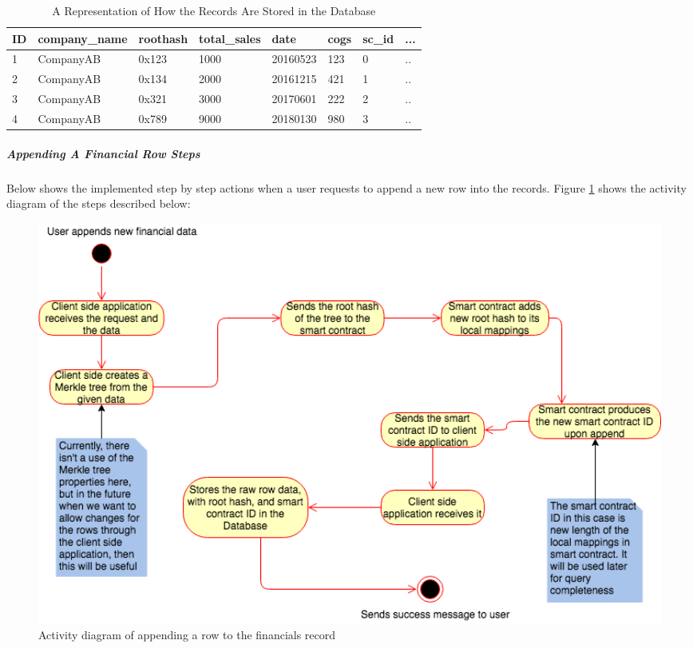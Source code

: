 \begin{table} 
	\centering
	\caption{A Representation of How the Records Are Stored in the Database}
    \begin{tabular}{| l | l | l | l | l | l | l | l |}
    \hline
    ID & company\_name & roothash & total\_sales & date & cogs & sc\_id & ... \\ \hline
    1 & CompanyAB & 0x123 & 1000 & 20160523 & 123 & 0 & .. \\ \hline
    2 & CompanyAB & 0x134 & 2000 & 20161215 & 421 & 1 & .. \\ \hline
    3 & CompanyAB & 0x321 & 3000 & 20170601 & 222 & 2 & .. \\ \hline
    4 & CompanyAB & 0x789 & 9000 & 20180130 & 980 & 3 & .. \\ \hline
    \end{tabular}
	\label{table:recordsOffChain}
\end{table}

\subparagraph{Appending A Financial Row Steps}
Below shows the implemented step by step actions when a user requests to append a new row into the records. Figure \ref{fig:appendRowFinancials} shows the activity diagram of the steps described below: 

\begin{figure}[h]
	\centering
	\includegraphics[width=1.0\textwidth]{images/appendRowFinancials.png}
	\caption{\label{fig:appendRowFinancials}Activity diagram of appending a row to the financials record}
\end{figure}

